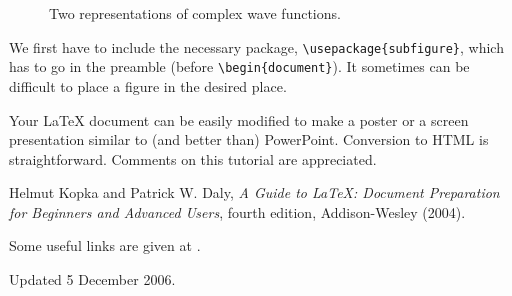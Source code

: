 \documentclass[12pt]{article}
\begin{document}
\begin{figure}[h!]
\begin{center}
\caption{\label{fig:qm/complexfunctions} Two representations of complex
wave functions.}
\end{center}
\end{figure}

We first have to include the necessary package,
\verb+\usepackage{subfigure}+, which has to go in the preamble (before
\verb+\begin{document}+). It sometimes can be difficult to place a figure in
the desired place.

Your LaTeX document can be easily modified to make a poster or a screen
presentation similar to (and better than) PowerPoint. Conversion to HTML is
straightforward. Comments on this tutorial are appreciated.

\begin{thebibliography}{5}

Helmut Kopka and Patrick W. Daly, \textsl{A Guide to
\LaTeX: Document Preparation for Beginners and Advanced Users},
fourth edition, Addison-Wesley (2004).

Some useful links are
given at \url{}.

\end{thebibliography}

{\small \noindent Updated 5 December 2006.}
\end{document}
